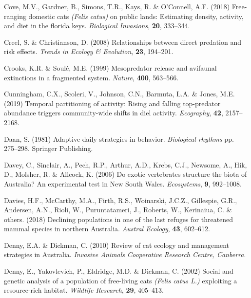 \documentclass[11pt,a4paper,titlepage,twoside,openright]{style/unimelbthesis}
\begin{document}
\begin{mainmatter}
\leavevmode\hypertarget{ref-cove2018free}{}%
Cove, M.V., Gardner, B., Simons, T.R., Kays, R. \& O'Connell, A.F. (2018) Free-ranging domestic cats \emph{(Felis catus)} on public lands: Estimating density, activity, and diet in the florida keys. \emph{Biological Invasions}, \textbf{20}, 333--344.

\leavevmode\hypertarget{ref-creel2008relationships}{}%
Creel, S. \& Christianson, D. (2008) Relationships between direct predation and risk effects. \emph{Trends in Ecology \& Evolution}, \textbf{23}, 194--201.

\leavevmode\hypertarget{ref-crooks1999mesopredator}{}%
Crooks, K.R. \& Soulé, M.E. (1999) Mesopredator release and avifaunal extinctions in a fragmented system. \emph{Nature}, \textbf{400}, 563--566.

\leavevmode\hypertarget{ref-cunningham2019temporal}{}%
Cunningham, C.X., Scoleri, V., Johnson, C.N., Barmuta, L.A. \& Jones, M.E. (2019) Temporal partitioning of activity: Rising and falling top-predator abundance triggers community-wide shifts in diel activity. \emph{Ecography}, \textbf{42}, 2157--2168.

\leavevmode\hypertarget{ref-daan1981adaptive}{}%
Daan, S. (1981) Adaptive daily strategies in behavior. \emph{Biological rhythms} pp. 275--298. Springer Publishing.

\leavevmode\hypertarget{ref-davey2006exotic}{}%
Davey, C., Sinclair, A., Pech, R.P., Arthur, A.D., Krebs, C.J., Newsome, A., Hik, D., Molsher, R. \& Allcock, K. (2006) Do exotic vertebrates structure the biota of Australia? An experimental test in New South Wales. \emph{Ecosystems}, \textbf{9}, 992--1008.

\leavevmode\hypertarget{ref-davies2018declining}{}%
Davies, H.F., McCarthy, M.A., Firth, R.S., Woinarski, J.C.Z., Gillespie, G.R., Andersen, A.N., Rioli, W., Puruntatameri, J., Roberts, W., Kerinaiua, C. \& others. (2018) Declining populations in one of the last refuges for threatened mammal species in northern Australia. \emph{Austral Ecology}, \textbf{43}, 602--612.

\leavevmode\hypertarget{ref-denny2010review}{}%
Denny, E.A. \& Dickman, C. (2010) Review of cat ecology and management strategies in Australia. \emph{Invasive Animals Cooperative Research Centre, Canberra}.

\leavevmode\hypertarget{ref-denny2002social}{}%
Denny, E., Yakovlevich, P., Eldridge, M.D. \& Dickman, C. (2002) Social and genetic analysis of a population of free-living cats \emph{(Felis catus L.)} exploiting a resource-rich habitat. \emph{Wildlife Research}, \textbf{29}, 405--413.


\end{mainmatter}
\end{document}
